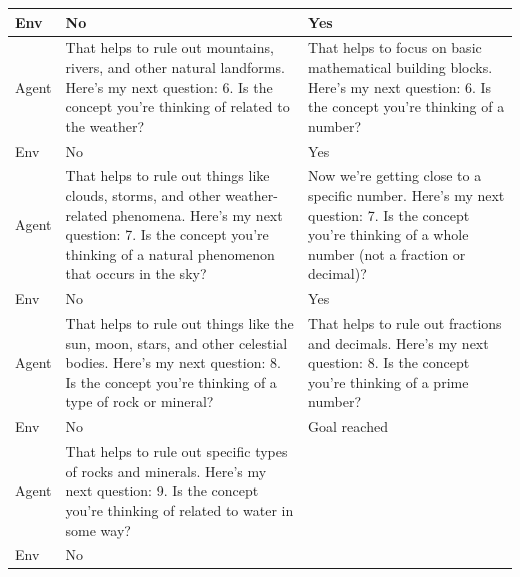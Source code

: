 \begin{table}[h]
{\begin{tabular}{|p{1cm} | p{7cm} | p{7cm}|}
        \hline
        Env & No & Yes \\
        \hline
        Agent & That helps to rule out mountains, rivers, and other natural landforms. Here's my next question: 6. Is the concept you're thinking of related to the weather? & That helps to focus on basic mathematical building blocks. Here's my next question: 6. Is the concept you're thinking of a number? \\
        \hline
        Env & No & Yes \\
        \hline
        Agent & That helps to rule out things like clouds, storms, and other weather-related phenomena. Here's my next question: 7. Is the concept you're thinking of a natural phenomenon that occurs in the sky? & Now we're getting close to a specific number. Here's my next question: 7. Is the concept you're thinking of a whole number (not a fraction or decimal)? \\
        \hline 
        Env & No & Yes \\
        \hline
        Agent & That helps to rule out things like the sun, moon, stars, and other celestial bodies. Here's my next question: 8. Is the concept you're thinking of a type of rock or mineral? & That helps to rule out fractions and decimals. Here's my next question: 8. Is the concept you're thinking of a prime number? \\
        \hline 
        Env & No & Goal reached \\
        \hline 
        Agent & That helps to rule out specific types of rocks and minerals. Here's my next question: 9. Is the concept you're thinking of related to water in some way? & \\
        \hline
        Env & No & \\
        \bottomrule
        \end{tabular}
    }
    \vspace{-0.3cm}
\end{table}

\newpage

